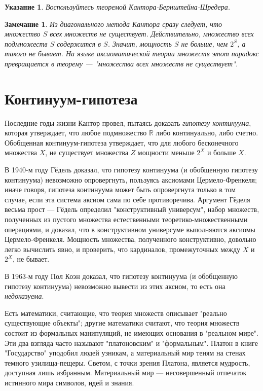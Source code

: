 \documentclass[12pt]{book}
\def\R{{\mathbb R}}
\theoremstyle{upshape}
\newtheorem{zadacha}{Задача}[chapter]
\theoremstyle{generic}
\newtheorem{remark}[teorema]{Замечание}
\def\замечание{\begin{remark}}
\def\еза{\end{remark}}
\theoremstyle{upshapenonumber}
\newtheorem{ukazanie}{Указание}[section]
\newcommand{\следствие}{%
     \refstepcounter{teorema}
     {\noindent\bf Следствие \thechapter.\arabic{teorema}:\ }}
\newcommand{\пример}{%
     \refstepcounter{teorema}
     {\noindent\bf Пример \thechapter.\arabic{teorema}:\ }}
\newcommand{\лемма}{%
     \refstepcounter{teorema}
     {\noindent\bf Лемма \thechapter.\arabic{teorema}:\ }}
\newcommand{\теорема}{%
     \refstepcounter{teorema}
     {\noindent\bf Теорема \thechapter.\arabic{teorema}:\ }}
\newcommand{\утверждение}{%
     \refstepcounter{teorema}
     {\noindent\bf Утверждение \thechapter.\arabic{teorema}:\ }}
\def\ем{\em}
\def\задача{\begin{zadacha}}
\def\ез{\end{zadacha}}
\def\указание{\begin{ukazanie}}
\def\еу{\end{ukazanie}}
\def\ео{\end{opredelenie}}
\def\енум{\begin{enumerate}}
\def\ее{\end{enumerate}}
\begin{document}
\указание
Воспользуйтесь теоремой Кантора-Бернштейна-Шредера.
\еу

\замечание
\label{_set_of_sets_Zamechanie_}
Из диагонального метода Кантора сразу следует,
что множество $S$ всех множеств не существует.
Действительно, множество всех подмножеств $S$ 
содержится в $S$. Значит, мощность $S$ не больше,
чем $2^S$, а такого
не бывает. На языке аксиоматической теории множеств
этот парадокс превращается в теорему --- 
"множества всех множеств не существует".
\еза



\section{Континуум-гипотеза}

Последние годы жизни Кантор провел, пытаясь доказать
{\ем гипотезу континуума}, которая утверждает, что
любое подмножество $\R$ либо континуально, либо счетно.
Обобщенная континуум-гипотеза утверждает, что
для любого бесконечного множества $X$,
не существует множества $Z$ мощности меньше 
$2^X$ и больше $X$. 

В 1940-м году Гёдель доказал, что гипотезу континуума
(и обобщенную гипотезу континуума) 
невозможно опровергнуть, пользуясь аксиомами
Цермело-Френкеля; иначе говоря, гипотеза континуума
может быть опровергнута только в том случае,
если эта система аксиом сама по себе противоречива.
Аргумент Гёделя весьма прост --- Гёдель
определил "конструктивный универсум",
набор множеств, полученных из пустого множества
естественными теоретико-множественными операциями,
и доказал, что в конструктивном универсуме
выполняются аксиомы Цермело-Френкеля. 
Мощность множества, полученного конструктивно, 
довольно легко вычислить явно, и проверить,
что кардиналов, промежуточных между $X$ и $2^X$,
не бывает.

В 1963-м году Пол Коэн доказал, что гипотезу
континуума (и обобщенную гипотезу континуума) 
невозможно вывести из этих аксиом,
то есть она {\ем недоказуема}.

Есть математики, считающие, что теория множеств
описывает "реально существующие объекты"; другие
математики считают, что теория множеств состоит
из формальных манипуляций, не имеющих основания
в "реальном мире". Эти два взгляда часто называют
"платоновским" и "формальным". Платон в книге 
"Государство" уподобил людей узникам, а 
материальный мир теням на стенах темного
узилища-пещеры. Светом, с точки зрения
Платона, является мудрость, доступная
лишь избранным. Материальный мир --- 
несовершенный отпечаток истинного мира
символов, идей и знания.
\end{document}
